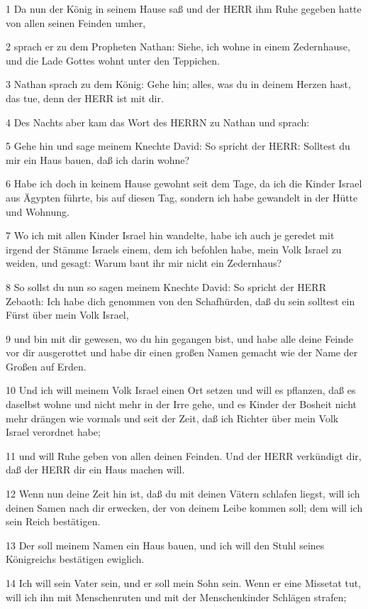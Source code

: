 \par 1 Da nun der König in seinem Hause saß und der HERR ihm Ruhe gegeben hatte von allen seinen Feinden umher,
\par 2 sprach er zu dem Propheten Nathan: Siehe, ich wohne in einem Zedernhause, und die Lade Gottes wohnt unter den Teppichen.
\par 3 Nathan sprach zu dem König: Gehe hin; alles, was du in deinem Herzen hast, das tue, denn der HERR ist mit dir.
\par 4 Des Nachts aber kam das Wort des HERRN zu Nathan und sprach:
\par 5 Gehe hin und sage meinem Knechte David: So spricht der HERR: Solltest du mir ein Haus bauen, daß ich darin wohne?
\par 6 Habe ich doch in keinem Hause gewohnt seit dem Tage, da ich die Kinder Israel aus Ägypten führte, bis auf diesen Tag, sondern ich habe gewandelt in der Hütte und Wohnung.
\par 7 Wo ich mit allen Kinder Israel hin wandelte, habe ich auch je geredet mit irgend der Stämme Israels einem, dem ich befohlen habe, mein Volk Israel zu weiden, und gesagt: Warum baut ihr mir nicht ein Zedernhaus?
\par 8 So sollst du nun so sagen meinem Knechte David: So spricht der HERR Zebaoth: Ich habe dich genommen von den Schafhürden, daß du sein solltest ein Fürst über mein Volk Israel,
\par 9 und bin mit dir gewesen, wo du hin gegangen bist, und habe alle deine Feinde vor dir ausgerottet und habe dir einen großen Namen gemacht wie der Name der Großen auf Erden.
\par 10 Und ich will meinem Volk Israel einen Ort setzen und will es pflanzen, daß es daselbst wohne und nicht mehr in der Irre gehe, und es Kinder der Bosheit nicht mehr drängen wie vormals und seit der Zeit, daß ich Richter über mein Volk Israel verordnet habe;
\par 11 und will Ruhe geben von allen deinen Feinden. Und der HERR verkündigt dir, daß der HERR dir ein Haus machen will.
\par 12 Wenn nun deine Zeit hin ist, daß du mit deinen Vätern schlafen liegst, will ich deinen Samen nach dir erwecken, der von deinem Leibe kommen soll; dem will ich sein Reich bestätigen.
\par 13 Der soll meinem Namen ein Haus bauen, und ich will den Stuhl seines Königreichs bestätigen ewiglich.
\par 14 Ich will sein Vater sein, und er soll mein Sohn sein. Wenn er eine Missetat tut, will ich ihn mit Menschenruten und mit der Menschenkinder Schlägen strafen;
